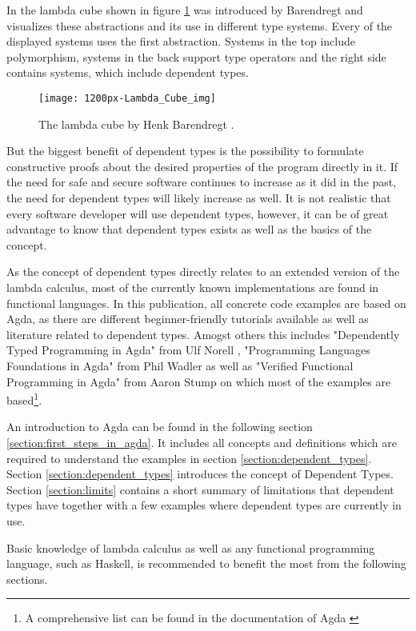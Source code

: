 In the lambda cube shown in figure \ref{fig:lambda_cube} was introduced by Barendregt \cite{lambda_cube} and visualizes these abstractions and its use in different type systems. Every of the displayed systems uses the first abstraction. Systems in the top include polymorphism, systems in the back support type operators and the right side contains systems, which include dependent types.
\begin{figure}[h]
\centering
\texttt{[image: 1200px-Lambda\_Cube\_img]}
\caption{The lambda cube by Henk Barendregt \cite{lambda_cube}.}
\label{fig:lambda_cube}
\end{figure}

But the biggest benefit of dependent types is the possibility to formulate constructive proofs about the desired properties of the program directly in it.
If the need for safe and secure software continues to increase as it did in the past, the need for dependent types will likely increase as well.
It is not realistic that every software developer will use dependent types, however, it can be of great advantage to know that dependent types exists as well as the basics of the concept.

As the concept of dependent types directly relates to an extended version of the lambda calculus, most of the currently known implementations are found in functional languages.
In this publication, all concrete code examples are based on Agda, as there are different beginner-friendly tutorials available as well as literature related to dependent types. Amogst others this includes "Dependently Typed Programming in Agda" from Ulf Norell \cite{norell:deptyped}, "Programming Languages Foundations in Agda" from Phil Wadler \cite{plfa2019} as well as "Verified Functional Programming in Agda" from Aaron Stump \cite{10.1145/2841316} on which most of the examples are based\footnote{A comprehensive list can be found in the documentation of Agda \cite{AgdaReadTheDocs}}.

An introduction to Agda can be found in the following section \ref{section:first_steps_in_agda}.
It includes all concepts and definitions which are required to understand the examples in section \ref{section:dependent_types}.
Section \ref{section:dependent_types} introduces the concept of Dependent Types.
Section \ref{section:limits} contains a short summary of limitations that dependent types have together with a few examples where dependent types are currently in use.

Basic knowledge of lambda calculus as well as any functional programming language, such as Haskell, is recommended to benefit the most from the following sections.
